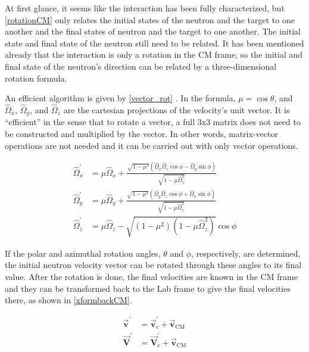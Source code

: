 At first glance, it seems like the interaction has been fully characterized, but \eqref{rotationCM} only relates the initial states of the neutron and the target to one another and the final states of neutron and the target to one another.  The initial state and final state of the neutron still need to be related.  It has been mentioned already that the interaction is only a rotation in the CM frame, so the initial and final state of the neutron's direction can be related by a three-dimensional rotation formula.  

An efficient algorithm is given by \eqref{vector_rot} \cite{openmc}.  In the formula, $\mu=\cos \theta$, and $\hat{{\Omega}}_x$, $\hat{\Omega}_y$, and $\hat{\Omega}_z$ are the cartesian projections of the velocity's unit vector.  It is ``efficient'' in the sense that to rotate a vector, a full 3x3 matrix does not need to be constructed and multiplied by the vector. In other words, matrix-vector operations are not needed and it can be carried out with only vector operations.

\begin{equation}
\begin{split}
\hat{\Omega}_x^{\prime} &= \mu \hat{\Omega}_x + \frac{\sqrt{1-\mu^2} (\hat{\Omega}_x \hat{\Omega}_z \cos \phi - \hat{\Omega}_y \sin \phi)}{ \sqrt{1-\mu \hat{\Omega}_z^2}} \\
\hat{\Omega}_y^{\prime} &= \mu \hat{\Omega}_y + \frac{\sqrt{1-\mu^2} (\hat{\Omega}_y \hat{\Omega}_z \cos \phi + \hat{\Omega}_x \sin \phi)}{ \sqrt{1-\mu \hat{\Omega}_z^2}} \\
\hat{\Omega}_z^{\prime} &= \mu \hat{\Omega}_z - \sqrt{ (1-\mu^2) (1-\mu \hat{\Omega}_z^2) }  \cos \phi 
\end{split}
\label{vector_rot}
\end{equation}

If the polar and azimuthal rotation angles, $\theta$ and $\phi$, respectively, are determined, the initial neutron velocity vector can be rotated through these angles to its final value.  After the rotation is done, the final velocities are known in the CM frame and they can be transformed back to the Lab frame to give the final velocities there, as shown in \eqref{xformbackCM}.

\begin{equation}
\begin{split}
 \boldsymbol{\vec{v}^{\prime}}  &= \boldsymbol{\vec{v}_{\mathrm{c}}^{\prime}} + \boldsymbol{\vec{v}_{\mathrm{CM}}} \\  
 \boldsymbol{\vec{V}^{\prime}} &= \boldsymbol{\vec{V}_{\mathrm{c}}^{\prime}} + \boldsymbol{\vec{v}_{\mathrm{CM}}}
 \end{split}
\label{xformbackCM}
\end{equation}


